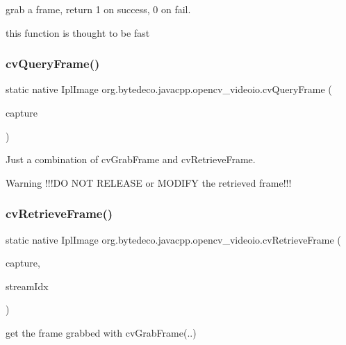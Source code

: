 grab a frame, return 1 on success, 0 on fail. 

this function is thought to be fast \mbox{\label{group__videoio__c_ga5c8fd8eb6b93a72085abecae04eebb12}} 
\subsubsection{\texorpdfstring{cv\+Query\+Frame()}{cvQueryFrame()}}
{\footnotesize\ttfamily static native Ipl\+Image org.\+bytedeco.\+javacpp.\+opencv\+\_\+videoio.\+cv\+Query\+Frame (\begin{DoxyParamCaption}\item[{Cv\+Capture}]{capture }\end{DoxyParamCaption})\hspace{0.3cm}{\ttfamily [static]}}



Just a combination of cv\+Grab\+Frame and cv\+Retrieve\+Frame. 

\begin{DoxyWarning}{Warning}
!!!\+DO N\+OT R\+E\+L\+E\+A\+SE or M\+O\+D\+I\+FY the retrieved frame!!! 
\end{DoxyWarning}
\mbox{\label{group__videoio__c_ga0bb2a83d7a4cd242fae9561742b4af37}} 
\subsubsection{\texorpdfstring{cv\+Retrieve\+Frame()}{cvRetrieveFrame()}}
{\footnotesize\ttfamily static native Ipl\+Image org.\+bytedeco.\+javacpp.\+opencv\+\_\+videoio.\+cv\+Retrieve\+Frame (\begin{DoxyParamCaption}\item[{Cv\+Capture}]{capture,  }\item[{int}]{stream\+Idx }\end{DoxyParamCaption})\hspace{0.3cm}{\ttfamily [static]}}



get the frame grabbed with cv\+Grab\+Frame(..) 

